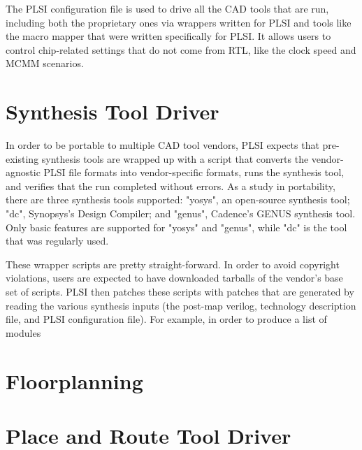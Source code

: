 \documentclass{article}
\begin{document}
The PLSI configuration file is used to drive all the CAD tools that are run,
including both the proprietary ones via wrappers written for PLSI and tools
like the macro mapper that were written specifically for PLSI.  It allows users
to control chip-related settings that do not come from RTL, like the clock
speed and MCMM scenarios.

\section{Synthesis Tool Driver}

In order to be portable to multiple CAD tool vendors, PLSI expects that
pre-existing synthesis tools are wrapped up with a script that converts the
vendor-agnostic PLSI file formats into vendor-specific formats, runs the
synthesis tool, and verifies that the run completed without errors.  As a study
in portability, there are three synthesis tools supported: "yosys", an
open-source synthesis tool; "dc", Synopsys's Design Compiler; and "genus",
Cadence's GENUS synthesis tool.  Only basic features are supported for "yosys"
and "genus", while "dc" is the tool that was regularly used.

These wrapper scripts are pretty straight-forward.  In order to avoid copyright
violations, users are expected to have downloaded tarballs of the vendor's base
set of scripts.  PLSI then patches these scripts with patches that are
generated by reading the various synthesis inputs (the post-map verilog,
technology description file, and PLSI configuration file).  For example, in
order to produce a list of modules

\section{Floorplanning}

\section{Place and Route Tool Driver}
\end{document}
